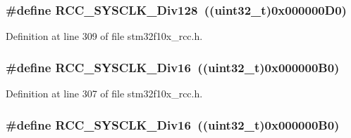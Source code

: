 \subsubsection[{\texorpdfstring{R\+C\+C\+\_\+\+S\+Y\+S\+C\+L\+K\+\_\+\+Div128}{RCC_SYSCLK_Div128}}]{\setlength{\rightskip}{0pt plus 5cm}\#define R\+C\+C\+\_\+\+S\+Y\+S\+C\+L\+K\+\_\+\+Div128~(({\bf uint32\+\_\+t})0x000000\+D0)}\hypertarget{group___a_h_b__clock__source_ga1a28926fcb86112058a365e01fe9a46b}{}\label{group___a_h_b__clock__source_ga1a28926fcb86112058a365e01fe9a46b}


Definition at line 309 of file stm32f10x\+\_\+rcc.\+h.

\subsubsection[{\texorpdfstring{R\+C\+C\+\_\+\+S\+Y\+S\+C\+L\+K\+\_\+\+Div16}{RCC_SYSCLK_Div16}}]{\setlength{\rightskip}{0pt plus 5cm}\#define R\+C\+C\+\_\+\+S\+Y\+S\+C\+L\+K\+\_\+\+Div16~(({\bf uint32\+\_\+t})0x000000\+B0)}\hypertarget{group___a_h_b__clock__source_gaefd8df4be9c9dbd9cebfb2384933500a}{}\label{group___a_h_b__clock__source_gaefd8df4be9c9dbd9cebfb2384933500a}


Definition at line 307 of file stm32f10x\+\_\+rcc.\+h.

\subsubsection[{\texorpdfstring{R\+C\+C\+\_\+\+S\+Y\+S\+C\+L\+K\+\_\+\+Div16}{RCC_SYSCLK_Div16}}]{\setlength{\rightskip}{0pt plus 5cm}\#define R\+C\+C\+\_\+\+S\+Y\+S\+C\+L\+K\+\_\+\+Div16~(({\bf uint32\+\_\+t})0x000000\+B0)}\hypertarget{group___a_h_b__clock__source_gaefd8df4be9c9dbd9cebfb2384933500a}{}\label{group___a_h_b__clock__source_gaefd8df4be9c9dbd9cebfb2384933500a}


